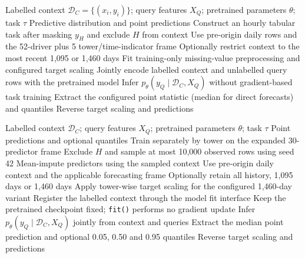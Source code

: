 \begin{algorithm}[H]
\caption{TabPFN inference for gap filling or direct daily forecasting}
\label{alg:app-tabpfn}
\small
\begin{algorithmic}[1]
\Require Labelled context $\mathcal D_C=\{(x_i,y_i)\}$; query features $X_Q$;
pretrained parameters $\theta$; task $\tau$
\Ensure Predictive distribution and point predictions
    \State Construct an hourly tabular task after masking $y_H$ and exclude $H$ from context
\Else
    \State Use pre-origin daily rows and the 52-driver plus 5 tower/time-indicator frame
    \State Optionally restrict context to the most recent 1,095 or 1,460 days
\EndIf
\State Fit training-only missing-value preprocessing and configured target scaling
\State Jointly encode labelled context and unlabelled query rows with the pretrained model
\State Infer $p_\theta(y_Q\mid\mathcal D_C,X_Q)$ without gradient-based task training
\State Extract the configured point statistic (median for direct forecasts) and quantiles
\State Reverse target scaling and \Return predictions
\end{algorithmic}
\end{algorithm}

\begin{algorithm}[H]
\caption{TabICLv2 inference for gap filling or direct daily forecasting}
\label{alg:app-tabicl}
\small
\begin{algorithmic}[1]
\Require Labelled context $\mathcal D_C$; query features $X_Q$;
pretrained parameters $\theta$; task $\tau$
\Ensure Point predictions and optional quantiles
    \State Train separately by tower on the expanded 30-predictor frame
    \State Exclude $H$ and sample at most 10,000 observed rows using seed 42
    \State Mean-impute predictors using the sampled context
\Else
    \State Use pre-origin daily context and the applicable forecasting frame
    \State Optionally retain all history, 1,095 days or 1,460 days
    \State Apply tower-wise target scaling for the configured 1,460-day variant
\EndIf
\State Register the labelled context through the model fit interface
\State Keep the pretrained checkpoint fixed; \texttt{fit()} performs no gradient update
\State Infer $p_\theta(y_Q\mid\mathcal D_C,X_Q)$ jointly from context and queries
\State Extract the median point prediction and optional 0.05, 0.50 and 0.95 quantiles
\State Reverse target scaling and \Return predictions
\end{algorithmic}
\end{algorithm}

